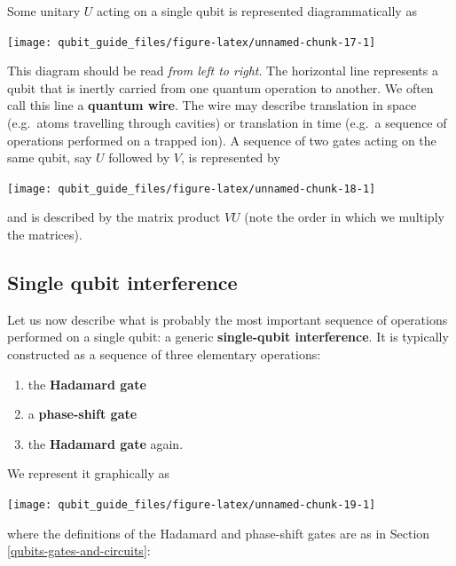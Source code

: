 \documentclass[fleqn,a4paper]{article}
\providecommand{\tightlist}{\setlength{\itemsep}{0pt}\setlength{\parskip}{0pt}}
\theoremstyle{definition}
\theoremstyle{definition}
\theoremstyle{definition}
\theoremstyle{definition}
\theoremstyle{remark}
\begin{document}
Some unitary \(U\) acting on a single qubit is represented diagrammatically as

\begin{center}\texttt{[image: qubit\_guide\_files/figure-latex/unnamed-chunk-17-1]} \end{center}

This diagram should be read \emph{from left to right}.
The horizontal line represents a qubit that is inertly carried from one quantum operation to another.
We often call this line a \textbf{quantum wire}.
The wire may describe translation in space (e.g.~atoms travelling through cavities) or translation in time (e.g.~a sequence of operations performed on a trapped ion).
A sequence of two gates acting on the same qubit, say \(U\) followed by \(V\), is represented by

\begin{center}\texttt{[image: qubit\_guide\_files/figure-latex/unnamed-chunk-18-1]} \end{center}

and is described by the matrix product \(VU\) (note the order in which we multiply the matrices).

\hypertarget{single-qubit-interference}{%
\subsection{Single qubit interference}\label{single-qubit-interference}}

Let us now describe what is probably the most important sequence of operations performed on a single qubit: a generic \textbf{single-qubit interference}.
It is typically constructed as a sequence of three elementary operations:

\begin{enumerate}
\def\labelenumi{\arabic{enumi}.}
\tightlist
\item
  the \textbf{Hadamard gate}
\item
  a \textbf{phase-shift gate}
\item
  the \textbf{Hadamard gate} again.
\end{enumerate}

We represent it graphically as

\begin{center}\texttt{[image: qubit\_guide\_files/figure-latex/unnamed-chunk-19-1]} \end{center}

where the definitions of the Hadamard and phase-shift gates are as in Section \ref{qubits-gates-and-circuits}:
\end{document}
